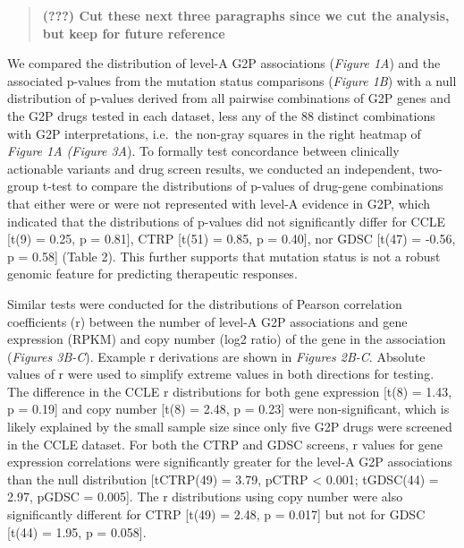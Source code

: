 \documentclass[man,floatsintext]{apa6}
\begin{document}
\begin{quote}
\textbf{(???) Cut these next three paragraphs since we cut the analysis,
but keep for future reference}
\end{quote}

We compared the distribution of level-A G2P associations (\emph{Figure
1A}) and the associated p-values from the mutation status comparisons
(\emph{Figure 1B}) with a null distribution of p-values derived from all
pairwise combinations of G2P genes and the G2P drugs tested in each
dataset, less any of the 88 distinct combinations with G2P
interpretations, i.e.~the non-gray squares in the right heatmap of
\emph{Figure 1A (Figure 3A}). To formally test concordance between
clinically actionable variants and drug screen results, we conducted an
independent, two-group t-test to compare the distributions of p-values
of drug-gene combinations that either were or were not represented with
level-A evidence in G2P, which indicated that the distributions of
p-values did not significantly differ for CCLE {[}t(9) = 0.25, p =
0.81{]}, CTRP {[}t(51) = 0.85, p = 0.40{]}, nor GDSC {[}t(47) = -0.56, p
= 0.58{]} (Table 2). This further supports that mutation status is not a
robust genomic feature for predicting therapeutic responses.

Similar tests were conducted for the distributions of Pearson
correlation coefficients (r) between the number of level-A G2P
associations and gene expression (RPKM) and copy number (log2 ratio) of
the gene in the association (\emph{Figures 3B-C}). Example r derivations
are shown in \emph{Figures 2B-C}. Absolute values of r were used to
simplify extreme values in both directions for testing. The difference
in the CCLE \textbar{}r\textbar{} distributions for both gene expression
{[}t(8) = 1.43, p = 0.19{]} and copy number {[}t(8) = 2.48, p = 0.23{]}
were non-significant, which is likely explained by the small sample size
since only five G2P drugs were screened in the CCLE dataset. For both
the CTRP and GDSC screens, \textbar{}r\textbar{} values for gene
expression correlations were significantly greater for the level-A G2P
associations than the null distribution {[}tCTRP(49) = 3.79, pCTRP
\textless{} 0.001; tGDSC(44) = 2.97, pGDSC = 0.005{]}. The
\textbar{}r\textbar{} distributions using copy number were also
significantly different for CTRP {[}t(49) = 2.48, p = 0.017{]} but not
for GDSC {[}t(44) = 1.95, p = 0.058{]}.
\end{document}

